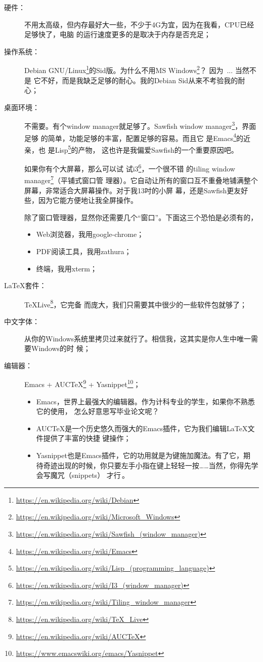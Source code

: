 \documentclass{swfcthesis}
\begin{document}
\begin{description}
\item[硬件：]不用太高级，但内存最好大一些，不少于4G为宜，因为在我看，CPU已经足够快了，电脑
  的运行速度更多的是取决于内存是否充足；
\item[操作系统：]Debian
  GNU/Linux\footnote{\url{https://en.wikipedia.org/wiki/Debian}}的Sid版。为什么不用MS
  Windows\footnote{\url{https://en.wikipedia.org/wiki/Microsoft_Windows}}？ 因为~... 当然不是
  它不好，而是我缺乏足够的耐心。我的Debian Sid从来不考验我的耐心；
\item[桌面环境：]不需要。有个window manager就足够了。Sawfish window
  manager\footnote{\url{https://en.wikipedia.org/wiki/Sawfish_(window_manager)}}，界面足够
  的简单，功能足够的丰富，配置足够的容易。而且它
  是Emacs\footnote{\url{https://en.wikipedia.org/wiki/Emacs}}的近亲，也
  是Lisp\footnote{\url{https://en.wikipedia.org/wiki/Lisp_(programming_language)}}的产物，
  这也许是我偏爱Sawfish的一个重要原因吧。

  如果你有个大屏幕，那么可以试
  试i3\footnote{\url{https://en.wikipedia.org/wiki/I3_(window_manager)}}，一个很不错
  的tiling window
  manager\footnote{\url{https://en.wikipedia.org/wiki/Tiling_window_manager}}（平铺式窗口管
  理器）。它自动让所有的窗口互不重叠地铺满整个屏幕，非常适合大屏幕操作。对于我13吋的小屏
  幕，还是Sawfish更友好些，因为它能方便地让我全屏操作。

  除了窗口管理器，显然你还需要几个“窗口”。下面这三个恐怕是必须有的，

  \begin{itemize}
  \item Web浏览器，我用google-chrome；
  \item PDF阅读工具，我用zathura；
  \item 终端，我用xterm；
  \end{itemize}

\item[\LaTeX{}套件：]TeXLive\footnote{\url{https://en.wikipedia.org/wiki/TeX_Live}}，它完备
  而庞大，我们只需要其中很少的一些软件包就够了；
\item[中文字体：]从你的Windows系统里拷贝过来就行了。相信我，这其实是你人生中唯一需要Windows的时
  候；
\item[编辑器：]Emacs + AUC\TeX{}\footnote{\url{https://en.wikipedia.org/wiki/AUCTeX}} +
  Yasnippet\footnote{\url{https://www.emacswiki.org/emacs/Yasnippet}}；

  \begin{itemize}
  \item Emacs，世界上最强大的编辑器。\cite{emacs}作为计科专业的学生，如果你不熟悉它的使用，
    怎么好意思写毕业论文呢？
  \item AUC\TeX{}是一个历史悠久而强大的Emacs插件，它为我们编辑\LaTeX{}文件提供了丰富的快捷
    键操作；\cite{auctex}
  \item Yasnippet也是Emacs插件，它的功用就是为\Tab{}键施加魔法。\cite{yasnippet}有了它，期
    待奇迹出现的时候，你只要左手小指在\Tab{}键上轻轻一按……当然，你得先学会写魔咒（snippets）
    才行\,\Frowny{}。\label{p:yasnippet}
  \end{itemize}


\end{description}
\end{document}
